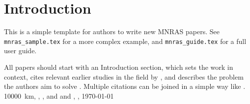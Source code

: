 \section{Introduction}

This is a simple template for authors to write new MNRAS papers.
See \texttt{mnras\_sample.tex} for a more complex example, and \texttt{mnras\_guide.tex}
for a full user guide.

All papers should start with an Introduction section, which sets the work
in context, cites relevant earlier studies in the field by \citet{Fournier1901},
and describes the problem the authors aim to solve \citep[e.g.][]{vanDijk1902}.
Multiple citations can be joined in a simple way like \citet{deLaguarde1903, delaGuarde1904}. \SI{10000}{\km}, , ,  and  and  , , \today

